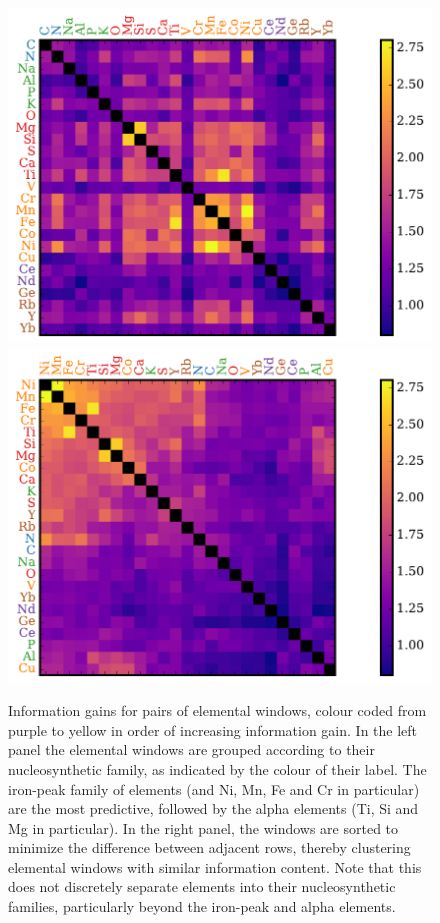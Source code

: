 \documentclass[a4paper,fleqn,usenatbib]{mnras}
\begin{document}
\begin{figure}
	\includegraphics[width=\columnwidth]{apogee_centers_final_29502_spc_win_wid_1p5_sorted_inf_gains_fam_z.pdf}
	\includegraphics[width=\columnwidth]{apogee_centers_final_29502_spc_win_wid_1p5_sorted_inf_gains_abs_min_tot_dist.pdf}
    \caption{Information gains for pairs of elemental windows, colour coded from purple to yellow in order of increasing information gain. In the left panel the elemental windows are grouped according to their nucleosynthetic family, as indicated by the colour of their label. The iron-peak family of elements (and Ni, Mn, Fe and Cr in particular) are the most predictive, followed by the alpha elements (Ti, Si and Mg in particular). In the right panel, the windows are sorted to minimize the difference between adjacent rows, thereby clustering elemental windows with similar information content. Note that this does not discretely separate elements into their nucleosynthetic families, particularly beyond the iron-peak and alpha elements.}
    \label{fig:all_element_information}
\end{figure}
\end{document}
